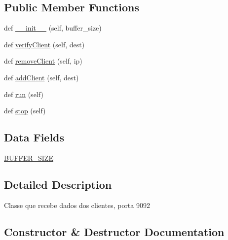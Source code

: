 \subsection*{Public Member Functions}
\begin{DoxyCompactItemize}
\item 
def \hyperlink{class_client_1_1_client_reseiver_a8e9700e92cd4deb19f86ea6dc2f98cd3}{\+\_\+\+\_\+init\+\_\+\+\_\+} (self, buffer\+\_\+size)
\item 
def \hyperlink{class_client_1_1_client_reseiver_aa5069a51ca05aeb44e006dba3be07296}{verify\+Client} (self, dest)
\item 
def \hyperlink{class_client_1_1_client_reseiver_a0469460401aae7675477714179dfcf6f}{remove\+Client} (self, ip)
\item 
def \hyperlink{class_client_1_1_client_reseiver_a011b151c914b97254dbfb0c745ce6c84}{add\+Client} (self, dest)
\item 
def \hyperlink{class_client_1_1_client_reseiver_ad22709b2e67308af35f55680d5a026e0}{run} (self)
\item 
def \hyperlink{class_client_1_1_client_reseiver_a26ca7c1c7fcdd35378e7be97727047a6}{stop} (self)
\end{DoxyCompactItemize}
\subsection*{Data Fields}
\begin{DoxyCompactItemize}
\item 
\hyperlink{class_client_1_1_client_reseiver_aa300d171bb6f6573a2de65c5342303c9}{B\+U\+F\+F\+E\+R\+\_\+\+S\+I\+ZE}
\end{DoxyCompactItemize}


\subsection{Detailed Description}
\begin{DoxyVerb}Classe que recebe dados dos clientes, porta 9092\end{DoxyVerb}
 

\subsection{Constructor \& Destructor Documentation}
\mbox{\label{class_client_1_1_client_reseiver_a8e9700e92cd4deb19f86ea6dc2f98cd3}} 
